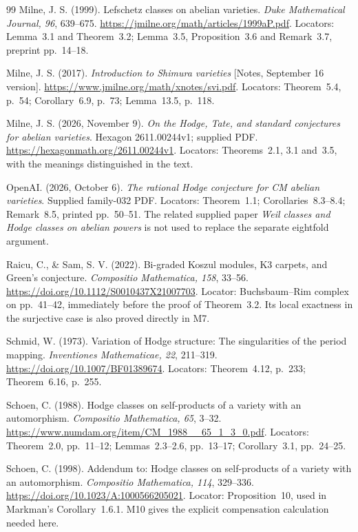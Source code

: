 \begin{thebibliography}{99}
Milne, J. S. (1999). Lefschetz classes on abelian varieties. \emph{Duke Mathematical Journal, 96}, 639--675. \url{https://jmilne.org/math/articles/1999aP.pdf}. Locators: Lemma~3.1 and Theorem~3.2; Lemma~3.5, Proposition~3.6 and Remark~3.7, preprint pp.~14--18.

Milne, J. S. (2017). \emph{Introduction to Shimura varieties} [Notes, September 16 version]. \url{https://www.jmilne.org/math/xnotes/svi.pdf}. Locators: Theorem~5.4, p.~54; Corollary~6.9, p.~73; Lemma~13.5, p.~118.

Milne, J. S. (2026, November 9). \emph{On the Hodge, Tate, and standard conjectures for abelian varieties}. Hexagon 2611.00244v1; supplied PDF. \url{https://hexagonmath.org/2611.00244v1}. Locators: Theorems~2.1, 3.1 and~3.5, with the meanings distinguished in the text.

OpenAI. (2026, October 6). \emph{The rational Hodge conjecture for CM abelian varieties}. Supplied family-032 PDF. Locators: Theorem~1.1; Corollaries~8.3--8.4; Remark~8.5, printed pp.~50--51. The related supplied paper \emph{Weil classes and Hodge classes on abelian powers} is not used to replace the separate eightfold argument.

Raicu, C., \& Sam, S. V. (2022). Bi-graded Koszul modules, K3 carpets, and Green's conjecture. \emph{Compositio Mathematica, 158}, 33--56. \url{https://doi.org/10.1112/S0010437X21007703}. Locator: Buchsbaum--Rim complex on pp.~41--42, immediately before the proof of Theorem~3.2. Its local exactness in the surjective case is also proved directly in M7.

Schmid, W. (1973). Variation of Hodge structure: The singularities of the period mapping. \emph{Inventiones Mathematicae, 22}, 211--319. \url{https://doi.org/10.1007/BF01389674}. Locators: Theorem~4.12, p.~233; Theorem~6.16, p.~255.

Schoen, C. (1988). Hodge classes on self-products of a variety with an automorphism. \emph{Compositio Mathematica, 65}, 3--32. \url{https://www.numdam.org/item/CM_1988__65_1_3_0.pdf}. Locators: Theorem~2.0, pp.~11--12; Lemmas~2.3--2.6, pp.~13--17; Corollary~3.1, pp.~24--25.

Schoen, C. (1998). Addendum to: Hodge classes on self-products of a variety with an automorphism. \emph{Compositio Mathematica, 114}, 329--336. \url{https://doi.org/10.1023/A:1000566205021}. Locator: Proposition~10, used in Markman's Corollary~1.6.1. M10 gives the explicit compensation calculation needed here.


\end{thebibliography}
